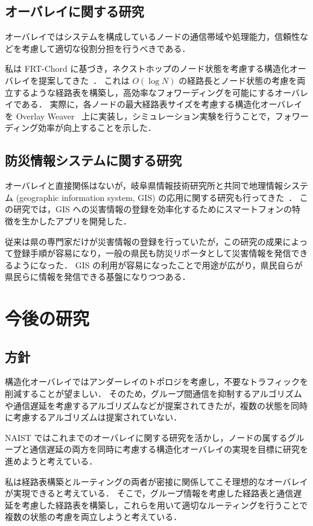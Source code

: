 \documentclass[10pt, a4paper, twocolumn]{jsarticle}
\begin{document}
\subsection{オーバレイに関する研究}
オーバレイではシステムを構成しているノードの通信帯域や処理能力，信頼性などを考慮して適切な役割分担を行うべきである．

私は FRT-Chord に基づき，ネクストホップのノード状態を考慮する構造化オーバレイを提案してきた~\cite{Shiraishi2016}．
これは $O(\log N)$ の経路長とノード状態の考慮を両立するような経路表を構築し，高効率なフォワーディングを可能にするオーバレイである．
実際に，各ノードの最大経路表サイズを考慮する構造化オーバレイを Overlay Weaver~\cite{Shudo2008} 上に実装し，シミュレーション実験を行うことで，フォワーディング効率が向上することを示した．

\subsection{防災情報システムに関する研究}
オーバレイと直接関係はないが，岐阜県情報技術研究所と共同で地理情報システム (geographic information system, GIS) の応用に関する研究も行ってきた~\cite{Shiraishi2014}．
この研究では，GIS への災害情報の登録を効率化するためにスマートフォンの特徴を生かしたアプリを開発した．

従来は県の専門家だけが災害情報の登録を行っていたが，この研究の成果によって登録手順が容易になり，一般の県民も防災リポータとして災害情報を発信できるようになった．
GIS の利用が容易になったことで用途が広がり，県民自らが県民らに情報を発信できる基盤になりつつある．


\section{今後の研究}
\subsection{方針}
構造化オーバレイではアンダーレイのトポロジを考慮し，不要なトラフィックを削減することが望ましい．
そのため，グループ間通信を抑制するアルゴリズムや通信遅延を考慮するアルゴリズムなどが提案されてきたが，複数の状態を同時に考慮するアルゴリズムは提案されていない．

NAIST ではこれまでのオーバレイに関する研究を活かし，ノードの属するグループと通信遅延の両方を同時に考慮する構造化オーバレイの実現を目標に研究を進めようと考えている．

私は経路表構築とルーティングの両者が密接に関係してこそ理想的なオーバレイが実現できると考えている．
そこで，グループ情報を考慮した経路表と通信遅延を考慮した経路表を構築し，これらを用いて適切なルーティングを行うことで複数の状態の考慮を両立しようと考えている．
\end{document}
